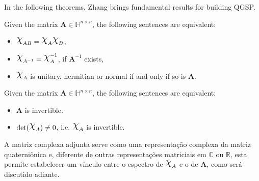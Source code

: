 In the following theorems, Zhang brings fundamental results for building QGSP.

\begin{theorem}
\label{th:equiv01}
Given the matrix $ \mathbf{A} \in \mathbb{H}^{n \times n} $, the following sentences are equivalent:

\begin{itemize}[noitemsep]
\item $ \rchi_{AB} = \rchi_{A} \rchi_{B} $,
\item $ \rchi_{A^{-1}} = \rchi_{A}^{-1}$, if $ \mathbf{A}^{-1} $ exists,
\item $ \rchi_{A}$ is unitary, hermitian or normal if and only if so is $ \mathbf{A} $.
\end{itemize}

\end{theorem}

\begin{theorem}
\label{th:equiv02}
Given the matrix $ \mathbf{A} \in \mathbb{H}^{n \times n} $, the following sentences are equivalent:

\begin{itemize}[noitemsep]
\item $\mathbf{A}$ is invertible.
\item $\mathrm{det}(\rchi_A) \neq 0$, i.e. $\rchi_{A}$ is invertible.
\end{itemize}

\end{theorem}



A matriz complexa adjunta serve como uma representa\c c\~ao complexa da matriz quaterni\^onica e, diferente de outras representa\c c\~oes matriciais em $ \mathbb{C} $ ou $ \mathbb{R} $, esta permite estabelecer um v\'inculo entre o espectro de $ \rchi_{A} $ e o de $ \mathbf{A} $, como ser\'a discutido adiante.

